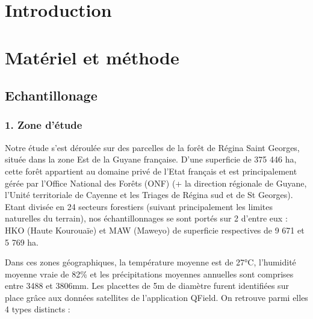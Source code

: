 \documentclass[
  
  
  
  
  ]{book}
\date{}
\makeatletter
\newcommand{\MemoirChapStyle}{}
\newcommand{\MemoirPageStyle}{}
\newlength\widthw %
\newlength{\rf}
\newcommand*{\SmallMargins}{
  \setlrmarginsandblock{}{}{*}
  \setmarginnotes{0.1in}{0.1in}{0.1in}
 \setulmarginsandblock{}{}{*}
  \checkandfixthelayout
  \ch@ngetext
  \clearpage
  \setlength{\widthw}{\textwidth+\marginparsep+\marginparwidth}
  \footnotesatfoot
  \chapterstyle{\MemoirChapStyle}  %
  \pagestyle{\MemoirPageStyle}
}
\newcommand{\LargeMargins}{\SmallMargins}
\makeatother
\begin{document}
\frontmatter











\LargeMargins
{
\setcounter{tocdepth}{1}
\tableofcontents
}



\LargeMargins
\hypertarget{introduction}{%
\chapter{Introduction}\label{introduction}}

\hypertarget{matuxe9riel-et-muxe9thode}{%
\chapter{Matériel et méthode}\label{matuxe9riel-et-muxe9thode}}

\hypertarget{echantillonage}{%
\section{Echantillonage}\label{echantillonage}}

\hypertarget{zone-duxe9tude}{%
\subsection{1. Zone d'étude}\label{zone-duxe9tude}}

Notre étude s'est déroulée sur des parcelles de la forêt de Régina Saint Georges, située dans la zone Est de la Guyane française. D'une superficie de 375 446 ha, cette forêt appartient au domaine privé de l'Etat français et est principalement gérée par l'Office National des Forêts (ONF) (+ la direction régionale de Guyane, l'Unité territoriale de Cayenne et les Triages de Régina sud et de St Georges).
Etant divisée en 24 secteurs forestiers (suivant principalement les limites naturelles du terrain), nos échantillonnages se sont portés sur 2 d'entre eux : HKO (Haute Kourouaïe) et MAW (Maweyo) de superficie respectives de 9 671 et 5 769 ha.

Dans ces zones géographiques, la température moyenne est de 27°C, l'humidité moyenne vraie de 82\% et les précipitations moyennes annuelles sont comprises entre 3488 et 3806mm.
Les placettes de 5m de diamètre furent identifiées sur place grâce aux données satellites de l'application QField. On retrouve parmi elles 4 types distincts :
\end{document}
